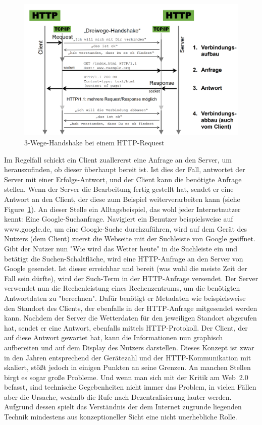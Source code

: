 \begin{figure}
	\includegraphics[width=\linewidth]{images/handshake}
	\caption{3-Wege-Handshake bei einem HTTP-Request~\cite{Kneisel.2017}}
	\label{fig:handshake}
\end{figure}

Im Regelfall schickt ein Client zuallererst eine Anfrage an den Server, um herauszufinden, ob dieser überhaupt bereit ist. 
Ist dies der Fall, antwortet der Server mit einer Erfolgs-Antwort, und der Client kann die benötigte Anfrage stellen. 
Wenn der Server die Bearbeitung fertig gestellt hat, sendet er eine Antwort an den Client, der diese zum Beispiel weiterverarbeiten kann (siehe Figure~\ref{fig:handshake}). 
An dieser Stelle ein Alltagsbeispiel, das wohl jeder Internetnutzer kennt: Eine Google-Suchanfrage. 
Navigiert ein Benutzer beispielsweise auf www.google.de, um eine Google-Suche durchzuführen, wird auf dem Gerät des Nutzers (dem Client) zuerst die Webseite mit der Suchleiste von Google geöffnet. 
Gibt der Nutzer nun "Wie wird das Wetter heute" in die Suchleiste ein und betätigt die Suchen-Schaltfläche, wird eine HTTP-Anfrage an den Server von Google gesendet. 
Ist dieser erreichbar und bereit (was wohl die meiste Zeit der Fall sein dürfte), wird der Such-Term in der HTTP-Anfrage versendet. 
Der Server verwendet nun die Rechenleistung eines Rechenzentrums, um die benötigten Antwortdaten zu "berechnen". 
Dafür benötigt er Metadaten wie beispielsweise den Standort des Clients, der ebenfalls in der HTTP-Anfrage mitgesendet werden kann. Nachdem der Server die Wetterdaten für den jeweiligen Standort abgerufen hat, sendet er eine Antwort, ebenfalls mittels HTTP-Protokoll. Der Client, der auf diese Antwort gewartet hat, kann die Informationen nun graphisch aufbereiten und auf dem Display des Nutzers darstellen.
Dieses Konzept ist zwar in den Jahren entsprechend der Gerätezahl und der HTTP-Kommunikation mit skaliert, stößt jedoch in einigen Punkten an seine Grenzen. An manchen Stellen birgt es sogar große Probleme. Und wenn man sich mit der Kritik am Web~2.0 befasst, sind technische Gegebenheiten nicht immer das Problem, in vielen Fällen aber die Ursache, weshalb die Rufe nach Dezentralisierung lauter werden.
Aufgrund dessen spielt das Verständnis der dem Internet zugrunde liegenden Technik mindestens aus konzeptioneller Sicht eine nicht unerhebliche Rolle.


